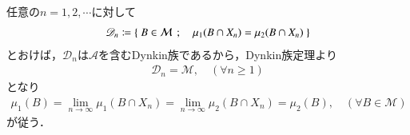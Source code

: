		\begin{prf}
			任意の$n = 1,2,\cdots$に対して
			\begin{align}
				\mathscr{D}_n \coloneqq \left\{\ B \in \mathcal{M}\ \, ; \quad \mu_1(B \cap X_n) = \mu_2(B \cap X_n)\ \right\}
			\end{align}
			とおけば，$\mathscr{D}_n$は$\mathcal{A}$を含むDynkin族であるから，Dynkin族定理より
			\begin{align}
				\mathscr{D}_n = \mathcal{M},\quad (\forall n \geq 1)
			\end{align}
			となり
			\begin{align}
				\mu_1(B) = \lim_{n \to \infty} \mu_1(B \cap X_n)
				= \lim_{n \to \infty} \mu_2(B \cap X_n) = \mu_2(B),
				\quad (\forall B \in \mathcal{M})
			\end{align}
			が従う．
			\QED
		\end{prf}
		
